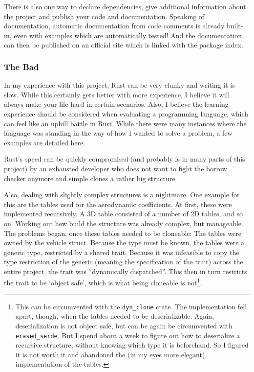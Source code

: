 There is also one way to declare dependencies, give additional information
about the project and publish your code and documentation. Speaking of
documentation, automatic documentation from code comments is already built-in,
even with examples which are automatically tested! And the documentation can
then be published on an official site which is linked with the package index.

\subsubsection{The Bad}\label{the-bad}

In my experience with this project, Rust can be very clunky and writing it is
slow. While this certainly gets better with more experience, I believe it will
always make your life hard in certain scenarios. Also, I believe the learning
experience should be considered when evaluating a programming language, which
can feel like an uphill battle in Rust. While there were many instances where
the language was standing in the way of how I wanted to solve a problem, a few
examples are detailed here.

Rust's speed can be quickly compromised (and probably is in many parts of this
project) by an exhausted developer who does not want to fight the borrow
checker anymore and simple clones a rather big structure.

Also, dealing with slightly complex structures is a nightmare. One example for
this are the tables used for the aerodynamic coefficients. At first, these
were implemented recursively. A 3D table consisted of a number of 2D tables,
and so on. Working out how build the structure was already complex, but
manageable. The problems began, once these tables needed to be cloneable: The
tables were owned by the vehicle struct. Because the type must be known, the
tables were a generic type, restricted by a shared trait. Because it was
infeasible to copy the type restriction of the generic (meaning the
specification of the trait) across the entire project, the trait was
``dynamically dispatched''. This then in turn restricts the trait to be
`object safe', which is what being cloneable is not\footnote{This can be circumvented with the
  \lstinline{dyn_clone} crate. The implementation fell apart, though, when the
  tables needed to be deserializable. Again, deserialization is not object safe,
  but can be again be circumvented with
  \lstinline{erased_serde}. But I spend about a week to figure out how to
  deserialize a recursive structure, without knowing which type it is
  beforehand. So I figured it is not worth it and abandoned the (in my eyes more
  elegant) implementation of the tables.}.


